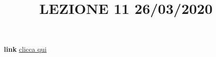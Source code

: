 \title{LEZIONE 11 26/03/2020}\newline
\textbf{link} \href{https://web.microsoftstream.com/video/55dca95e-fe7f-4bf2-82e6-d3024939e5c3?list=user&userId=faa91214-a6f5-40d7-8875-253fd49b8ce1}{clicca qui}
\subsection{}